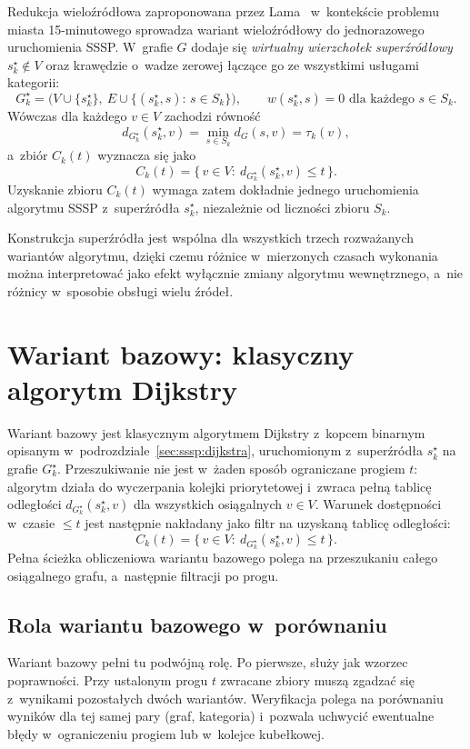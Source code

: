 Redukcja wieloźródłowa zaproponowana przez Lama~\cite{Lam2024}
w~kontekście problemu miasta 15-minutowego sprowadza wariant
wieloźródłowy do jednorazowego uruchomienia SSSP. W~grafie $G$ dodaje się
\emph{wirtualny wierzchołek superźródłowy} $s^\star_k\notin V$ oraz krawędzie
o~wadze zerowej łączące go ze wszystkimi usługami kategorii:
\[
G^\star_k=\bigl(V\cup\{s^\star_k\},\ E\cup\{(s^\star_k,s):\,s\in S_k\}\bigr),
\qquad
w(s^\star_k,s)=0\text{ dla każdego }s\in S_k.
\]
Wówczas dla każdego $v\in V$ zachodzi równość
\[
d_{G^\star_k}(s^\star_k,v)=\min_{s\in S_k} d_G(s,v)=\tau_k(v),
\]
a~zbiór $C_k(t)$ wyznacza się jako
\[
C_k(t)=\{\,v\in V:\ d_{G^\star_k}(s^\star_k,v)\le t\,\}.
\]
Uzyskanie zbioru $C_k(t)$ wymaga zatem dokładnie jednego uruchomienia algorytmu
SSSP z~superźródła $s^\star_k$, niezależnie od liczności zbioru $S_k$.

Konstrukcja superźródła jest wspólna dla wszystkich trzech rozważanych
wariantów algorytmu, dzięki czemu różnice w~mierzonych czasach wykonania
można interpretować jako efekt wyłącznie zmiany algorytmu wewnętrznego,
a~nie różnicy w~sposobie obsługi wielu źródeł.

\clearpage

\section{Wariant bazowy: klasyczny algorytm Dijkstry}
\label{sec:warianty:regular}

Wariant bazowy jest klasycznym algorytmem Dijkstry z~kopcem
binarnym opisanym w~podrozdziale~\ref{sec:sssp:dijkstra}, uruchomionym
z~superźródła $s^\star_k$ na grafie $G^\star_k$. Przeszukiwanie nie jest
w~żaden sposób ograniczane progiem $t$: algorytm działa do wyczerpania
kolejki priorytetowej i~zwraca pełną tablicę odległości $d_{G^\star_k}(s^\star_k,v)$
dla wszystkich osiągalnych $v\in V$. Warunek dostępności w~czasie $\le t$
jest następnie nakładany jako filtr na uzyskaną tablicę odległości:
\[
C_k(t)=\{\,v\in V:\ d_{G^\star_k}(s^\star_k,v)\le t\,\}.
\]
Pełna ścieżka obliczeniowa wariantu bazowego polega na 
przeszukaniu całego osiągalnego grafu, a~następnie filtracji po progu.

\subsection{Rola wariantu bazowego w~porównaniu}
\label{subsec:warianty:regular:rola}

Wariant bazowy pełni tu podwójną rolę. Po pierwsze, służy jak wzorzec poprawności.
Przy ustalonym progu $t$ zwracane zbiory muszą
zgadzać się z~wynikami pozostałych dwóch wariantów. Weryfikacja polega na
porównaniu wyników dla tej samej pary (graf, kategoria) i~pozwala uchwycić
ewentualne błędy w~ograniczeniu progiem lub w~kolejce kubełkowej.

